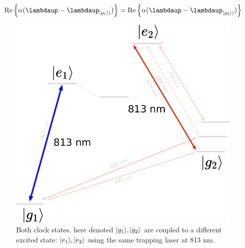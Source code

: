 \begin{equation}\label{eq:MagicCrossing}
    \operatorname{Re}\left\{\alpha(\lambdaup-\lambdaup_{\ket{g_1})})\right\} = 
    \operatorname{Re}\left\{\alpha(\lambdaup-\lambdaup_{\ket{g_2})})\right\}
\end{equation}

\begin{figure}
    \centering
    \includegraphics[width=.38\linewidth]{figures/2groundTweezer.pdf}
    \caption{Both clock states, here denoted $\lvert g_1\rangle, \lvert g_2\rangle$ are coupled to a different excited state: $\lvert e_1\rangle, \lvert e_2\rangle$ using the same trapping laser at 813 nm.}
    \label{fig:2LevelTweezer}
\end{figure}



	

